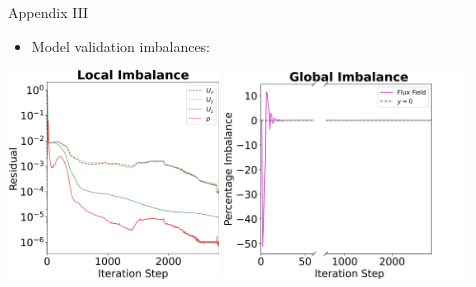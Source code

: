 \begin{frame}{Appendix III}
\begin{itemize}
    \item Model validation imbalances:
\end{itemize}
\vspace{3mm}
\centering
\includegraphics[trim = 0mm 0mm 0mm 0mm, clip, width=2.2in]{./images/residuals.png}
\hspace{3mm}
\centering
\includegraphics[trim = 0mm 0mm 0mm 0mm, clip, width=2.545in]{./images/global_imbalance.png}
\end{frame}



